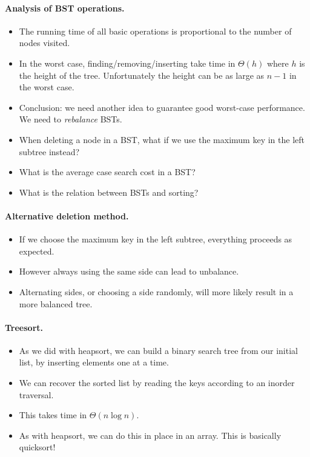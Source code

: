 \paragraph{Analysis of BST operations.}
\begin{itemize}
\item The running time of all basic operations is proportional to the number of 
nodes visited.
\item In the worst case, finding/removing/inserting take time in $\Theta(h)$ 
where $h$ is the height of the tree. Unfortunately the height can be as large 
as $n-1$ in the worst case.
\item Conclusion: we need another idea to guarantee good worst-case 
performance. We need to \emph{rebalance} BSTs.
\end{itemize}


\begin{itemize}
\item When deleting a node  in a BST, what if we use the maximum key in the left subtree instead?
\item What is the average case search cost in a BST?
\item What is the relation between BSTs and sorting?
\end{itemize}

\paragraph{Alternative deletion method.}
\begin{itemize}
\item If we choose the maximum key in the left subtree, everything proceeds as expected. 
\item However always using the same side can lead to unbalance.
\item Alternating sides, or choosing a side randomly, will more likely  result in a more balanced tree.
\end{itemize}

\paragraph{Treesort.}
\begin{itemize}
\item As we did with heapsort, we can build a binary search tree from our initial list, by inserting 
elements one at a time.
\item We can recover the sorted list by reading the keys according to an inorder traversal.
\item This takes time in $\Theta(n\log n)$.
\item As with heapsort, we can do this in place in an array. This is basically quicksort!
\end{itemize}

